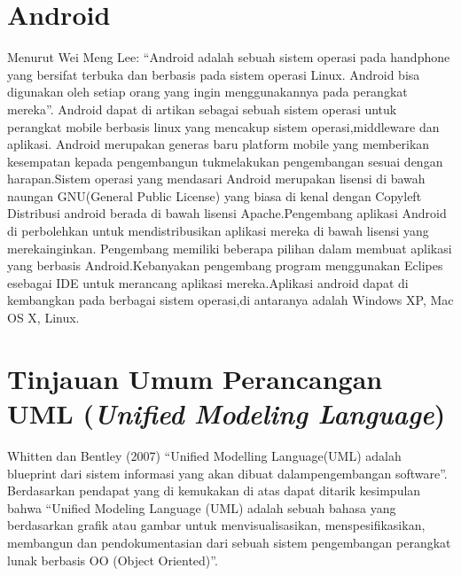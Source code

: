 \documentclass{jtetiproposalskripsi}
\begin{document}
\section{Android}
Menurut Wei Meng Lee: “Android adalah sebuah sistem operasi pada handphone yang bersifat terbuka dan berbasis pada sistem operasi Linux. Android bisa digunakan oleh setiap orang yang ingin menggunakannya pada perangkat mereka”.
Android dapat di artikan sebagai sebuah sistem operasi untuk perangkat mobile berbasis linux yang mencakup sistem operasi,middleware dan aplikasi. Android merupakan generas baru platform mobile yang memberikan kesempatan kepada pengembangun tukmelakukan pengembangan sesuai dengan harapan.Sistem operasi yang mendasari Android merupakan lisensi di bawah naungan GNU(General Public License) yang biasa di kenal dengan Copyleft Distribusi android berada di bawah lisensi Apache.Pengembang aplikasi Android di perbolehkan untuk mendistribusikan aplikasi mereka di bawah lisensi yang merekainginkan.
Pengembang memiliki beberapa pilihan dalam membuat aplikasi yang berbasis Android.Kebanyakan pengembang program menggunakan Eclipes esebagai IDE untuk merancang aplikasi mereka.Aplikasi android dapat di kembangkan pada berbagai sistem operasi,di antaranya adalah Windows XP, Mac OS X, Linux. 


\section{Tinjauan Umum Perancangan UML (\textit{Unified Modeling Language})}
Whitten dan Bentley (2007) “Unified Modelling Language(UML) adalah blueprint dari sistem informasi yang akan dibuat dalampengembangan software”. Berdasarkan pendapat yang di kemukakan di atas dapat ditarik kesimpulan bahwa “Unified Modeling Language (UML) adalah sebuah bahasa yang berdasarkan grafik atau gambar untuk menvisualisasikan, menspesifikasikan, membangun dan pendokumentasian dari sebuah sistem pengembangan perangkat lunak berbasis OO (Object Oriented)”.
\end{document}
